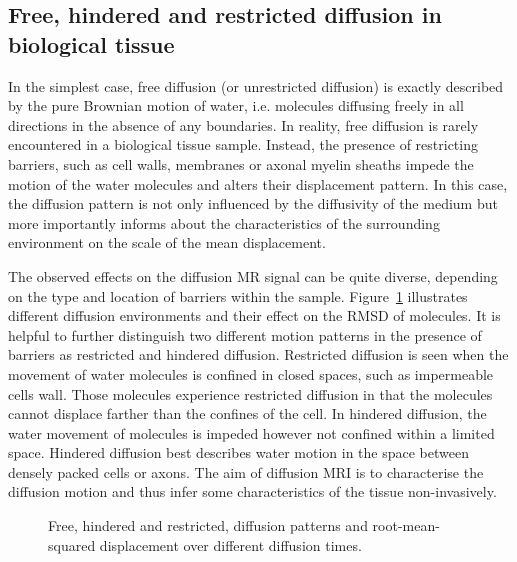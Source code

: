 \subsection[Types of diffusion]{Free, hindered and restricted diffusion in biological tissue}
In the simplest case, free diffusion (or unrestricted diffusion) is exactly described by the pure Brownian motion of water, i.e. molecules diffusing freely in all directions in the absence of any boundaries. In reality, free diffusion is rarely encountered in a biological tissue sample. Instead, the presence of restricting barriers, such as cell walls, membranes or axonal myelin sheaths impede the motion of the water molecules and alters their displacement pattern. In this case, the diffusion pattern is not only influenced by the diffusivity of the medium but more importantly informs about the characteristics of the surrounding environment on the scale of the mean displacement. 

The observed effects on the diffusion MR signal can be quite diverse, depending on the type and location of barriers within the sample. Figure~\ref{fig:chapter 2 types of diffusion} illustrates different diffusion environments and their effect on the \gls{RMSD} of molecules. It is helpful to further distinguish two different motion patterns in the presence of barriers as restricted and hindered diffusion.  Restricted diffusion is seen when the movement of water molecules is confined in closed spaces, such as impermeable cells wall. Those molecules experience restricted diffusion in that the molecules cannot displace farther than the confines of the cell. In hindered diffusion, the water movement of molecules is impeded however not confined within a limited space. Hindered diffusion best describes water motion in the space between densely packed cells or axons. The aim of diffusion MRI is to characterise the diffusion motion and thus infer some characteristics of the tissue non-invasively.


\begin{figure}[ht]
 \centering
  \hspace*{0.01\textwidth}
  \caption{Free, hindered and restricted,  diffusion patterns and root-mean-squared displacement over different diffusion times.}
  \label{fig:chapter 2 types of diffusion}
\end{figure}

